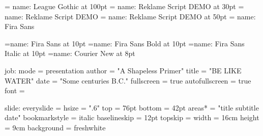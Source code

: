 %
%
%






\font\maintitlefont    = {name: League Gothic} at 100pt
\font\slidetitlefont   = {name: Reklame Script DEMO} at 30pt
\font\subtitlefont     = {name: Reklame Script DEMO}
\font\mainsubtitlefont = {name: Reklame Script DEMO} at 50pt
\font\titlefont        = {name: Fira Sans}





\font\tenrm={name: Fira Sans} at 10pt
\font\tenbf={name: Fira Sans Bold} at 10pt
\font\tenit={name: Fira Sans Italic} at 10pt
\font\tentt={name: Courier New} at 8pt

\def\Subtitle{A Shapeless Primer}


\setparameter job:
  mode           = presentation %
  author         = "A Shapeless Primer"
  title          = "BE LIKE WATER"
  date           = "Some centuries B.C."
  fullscreen     = true
  autofullscreen = true
  font           = \tenrm %

\setparameter slide:
  everyslide    = \everyslide
  hsize         = ".6\pdfpagewidth"
  top           = 76pt
  bottom        = 42pt
  areas*        = "title subtitle date"
  bookmarkstyle = italic
  baselineskip  = 12pt
  topskip       = \baselineskip
  width         = 16cm
  height        = 9cm
  background    = freshwhite

